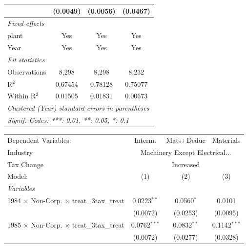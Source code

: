 \documentclass[
  12pt]{article}
\theoremstyle{definition}
\theoremstyle{remark}
\begin{document}
\begin{table}
\begin{minipage}{\linewidth}
\begin{tabular}{lccc}
                                                           & (0.0049)        & (0.0056)       & (0.0467)\\   
   \midrule
   \emph{Fixed-effects}\\
   plant                                                   & Yes             & Yes            & Yes\\  
   Year                                                    & Yes             & Yes            & Yes\\  
   \midrule
   \emph{Fit statistics}\\
   Observations                                            & 8,298           & 8,298          & 8,232\\  
   R$^2$                                                   & 0.67454         & 0.78128        & 0.75077\\  
   Within R$^2$                                            & 0.01505         & 0.01831        & 0.00673\\  
   \midrule \midrule
   \multicolumn{4}{l}{\emph{Clustered (Year) standard-errors in parentheses}}\\
   \multicolumn{4}{l}{\emph{Signif. Codes: ***: 0.01, **: 0.05, *: 0.1}}\\
\end{tabular}
\par\endgroup
\begingroup
\centering
\begin{tabular}{lccc}
   \tabularnewline \midrule \midrule
   Dependent Variables:                                    & Interm.        & Mats+Deduc    & Materials\\  
   Industry & \multicolumn{3}{c}{Machinery Except Electrical...} \\ 
   Tax Change & \multicolumn{3}{c}{Increased} \\ 
   Model:                                                  & (1)            & (2)           & (3)\\  
   \midrule
   \emph{Variables}\\
   1984 $\times$ Non-Corp. $\times$ treat\_3tax\_treat     & 0.0223$^{**}$  & 0.0560$^{*}$  & 0.0101\\   
                                                           & (0.0072)       & (0.0253)      & (0.0095)\\   
   1985 $\times$ Non-Corp. $\times$ treat\_3tax\_treat     & 0.0762$^{***}$ & 0.0832$^{**}$ & 0.1142$^{***}$\\   
                                                           & (0.0072)       & (0.0277)      & (0.0328)\\   

\end{tabular}
\end{minipage}
\end{table}
\end{document}
